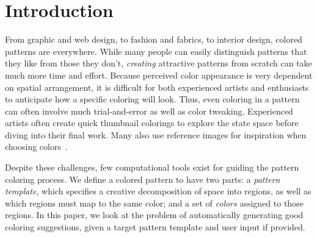 \section{Introduction}
\label{sec:introduction}

From graphic and web design, to fashion and fabrics, to interior design, colored patterns are everywhere. 
While many people can easily distinguish patterns that they like from those they don't, \emph{creating} attractive patterns from scratch can take much more time and effort. Because perceived color appearance is very dependent on spatial arrangement, it is difficult for both experienced artists and enthusiasts to anticipate how a specific coloring will look. Thus, even coloring in a pattern can often involve much trial-and-error as well as color tweaking. Experienced artists often create quick thumbnail colorings to explore the state space before diving into their final work. Many also use reference images for inspiration when choosing colors~\cite{ColorPaletteTools}.



Despite these challenges, few computational tools exist for guiding the pattern coloring process. We define a colored pattern to have two parts: a \emph{pattern template}, which specifies a creative decomposition of space into regions, as well as which regions must map to the same color; and a set of \emph{colors} assigned to those regions. In this paper, we look at the problem of automatically generating good coloring suggestions, given a target pattern template and user input if provided. 


